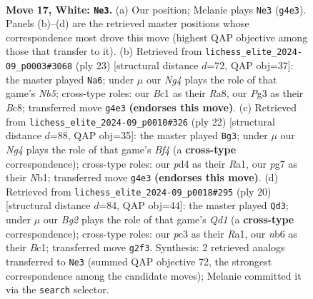 \documentclass[11pt]{article}
\begin{document}
\clearpage

\begin{figure}[p]\centering
\begin{subfigure}{0.46\textwidth}\centering
\resizebox{\linewidth}{!}{%
\newchessgame
\chessboard[
  setfen={rnbr2k1/1p2bpp1/pn1qp3/7p/3p2N1/1Pp3P1/P3PPBP/RNBQRK2 w - - 0 17},
  showmover=false,
  pgfstyle=straightmove, color=movearrow, markmove={g4-e3}
]}
\caption{}
\end{subfigure}\hfill
\begin{subfigure}{0.46\textwidth}\centering
\resizebox{\linewidth}{!}{%
\newchessgame
\chessboard[
  setfen={r1bq1rk1/2ppnpbp/6p1/pp1P4/1n2P3/PB3N2/1P3PPP/RNBQ1RK1 b - - 0 12},
  showmover=false,
  pgfstyle=straightmove, color=movearrow, markmove={b4-a6}
]}
\caption{}
\end{subfigure}
\\[4pt]
\begin{subfigure}{0.46\textwidth}\centering
\resizebox{\linewidth}{!}{%
\newchessgame
\chessboard[
  setfen={r1bq1rk1/2p1bppp/p2p1nn1/8/Pp2PB2/1B3N2/1PP2PPP/RN1QR1K1 w - - 2 12},
  showmover=false,
  pgfstyle=straightmove, color=movearrow, markmove={f4-g3}
]}
\caption{}
\end{subfigure}\hfill
\begin{subfigure}{0.46\textwidth}\centering
\resizebox{\linewidth}{!}{%
\newchessgame
\chessboard[
  setfen={r1bq1rk1/4bppp/p1pp1n2/P3p3/2B1P3/2N5/1PP2PPP/R1BQ1RK1 w - - 4 11},
  showmover=false,
  pgfstyle=straightmove, color=movearrow, markmove={d1-d3}
]}
\caption{}
\end{subfigure}
\caption{\textbf{Move 17, White: \texttt{Ne3}.} (a) Our position; Melanie plays \texttt{Ne3} (\texttt{g4e3}). Panels (b)--(d) are the retrieved master positions whose correspondence most drove this move (highest QAP objective among those that transfer to it). (b) Retrieved from \texttt{lichess\_elite\_2024-09\_p0003\#3068} (ply 23) [structural distance $d$=72, QAP obj=37]: the master played \texttt{Na6}; under $\mu$ our \emph{Ng4} plays the role of that game's \emph{Nb5}; cross-type roles: our \emph{B}c1 as their \emph{R}a8, our \emph{P}g3 as their \emph{B}c8; transferred move \texttt{g4e3} \textbf{(endorses this move)}. (c) Retrieved from \texttt{lichess\_elite\_2024-09\_p0010\#326} (ply 22) [structural distance $d$=88, QAP obj=35]: the master played \texttt{Bg3}; under $\mu$ our \emph{Ng4} plays the role of that game's \emph{Bf4} (a \textbf{cross-type} correspondence); cross-type roles: our \emph{p}d4 as their \emph{R}a1, our \emph{p}g7 as their \emph{N}b1; transferred move \texttt{g4e3} \textbf{(endorses this move)}. (d) Retrieved from \texttt{lichess\_elite\_2024-09\_p0018\#295} (ply 20) [structural distance $d$=84, QAP obj=44]: the master played \texttt{Qd3}; under $\mu$ our \emph{Bg2} plays the role of that game's \emph{Qd1} (a \textbf{cross-type} correspondence); cross-type roles: our \emph{p}c3 as their \emph{R}a1, our \emph{n}b6 as their \emph{B}c1; transferred move \texttt{g2f3}. Synthesis: 2 retrieved analogs transferred to \texttt{Ne3} (summed QAP objective 72, the strongest correspondence among the candidate moves); Melanie committed it via the \texttt{search} selector.}
\label{fig:thought-m32}
\end{figure}
\end{document}
